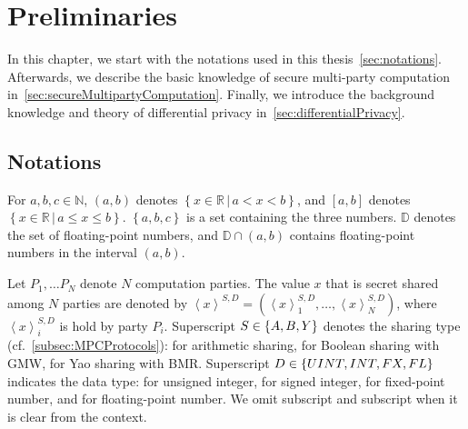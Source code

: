 \chapter{Preliminaries}
\label{cha:prelim}

In this chapter, we start with the notations used in this thesis~\autoref{sec:notations}. Afterwards, we describe the basic knowledge of secure multi-party computation in~\autoref{sec:secureMultipartyComputation}. Finally, we introduce the background knowledge and theory of differential privacy in~\autoref{sec:differentialPrivacy}.

\section{Notations}
\label{sec:notations}


For $a,b,c \in \mathbb{N} $, $\left(a,b\right) $ denotes $\left\{x\in \mathbb{R} \, | \, a<x< b\right\} $, and $\left[a,b\right] $ denotes $\left\{x\in \mathbb{R} \, | \,a\leq x\leq b\right\} $. $\left\{a,b,c\right\} $ is a set containing the three numbers.
$\mathbb{D}$ denotes the set of floating-point numbers, and $\mathbb{D} \cap \left(a,b\right) $ contains floating-point numbers in the interval $\left(a,b\right)$.

Let $P_1, \ldots P_{N} $ denote $N$ computation parties. The value $x$ that is secret shared among $N$ parties are denoted by $\left\langle x\right\rangle ^{S,D}=\left(\left\langle x\right\rangle_1^{S,D} ,\ldots, \left\langle x\right\rangle_N^{S,D}\right) $, where
$\left\langle x\right\rangle _i^{S,D}$ is hold by party $P_i$.
Superscript $S \in \left\{A,B,Y\right\} $ denotes the sharing type (cf.~\autoref{subsec:MPCProtocols}): \ARITH for arithmetic sharing, \BOOL for Boolean sharing with GMW, \YAO for Yao sharing with BMR.
Superscript $D \in \left\{UINT,INT,FX,FL \right\} $ indicates the data type: \uint for unsigned integer, \sint for signed integer, \fx for fixed-point number, and \fl for floating-point number. We omit subscript and subscript when it is clear from the context.

